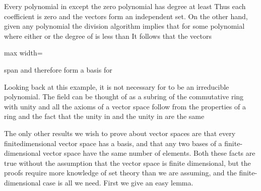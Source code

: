 \documentclass[11pt,oneside]{article}
\begin{document}
\begin{BookBody}
\noindent Every polynomial in  except the zero polynomial has degree at least  Thus each coefficient  is zero and the vectors  form an independent set. On the other hand, given any polynomial  the division algorithm implies that   for some polynomial  where either  or the degree of  is less than  It follows that the vectors

\begin{center}\begin{adjustbox}{max width=\linewidth}\end{adjustbox}\end{center}

\noindent span  and therefore form a basis for 

Looking back at this example, it is not necessary for  to be an irreducible polynomial. The field  can be thought of as a subring of the commutative ring with unity  and all the axioms of a vector space follow from the properties of a ring and the fact that the unity in  and the unity in  are the same\BookEnd{\blacktriangle}


\noindent The only other results we wish to prove about vector spaces are that every finitedimensional vector space has a basis, and that any two bases of a finite-dimensional 
vector space have the same number of elements. Both these facts are true without the assumption that the vector space is finite dimensional, but the proofs require more knowledge of set theory than we are assuming, and the finite-dimensional case is all we need. First we give an easy lemma.

\end{BookBody}

\BookNarrativetrue
\end{document}
